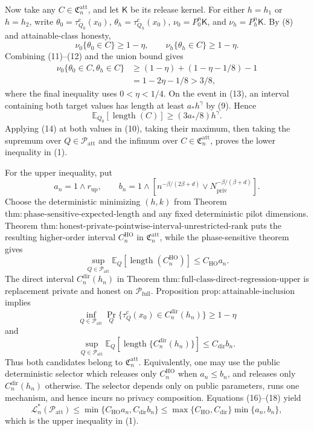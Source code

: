 Now take any \(C\in\mathfrak C_n^{\mathrm{att}}\), and let \(\mathsf K\)
be its release kernel.  For either \(h=h_1\) or \(h=h_2\), write
\(\theta_0=\tau_{Q_0}^{\mathrm c}(x_0)\),
\(\theta_h=\tau_{Q_h}^{\mathrm c}(x_0)\),
\(\nu_0=P_0^n\mathsf K\), and \(\nu_h=P_h^n\mathsf K\).  By (8) and
attainable-class honesty,
\[
 \nu_0\{\theta_0\in C\}\ge1-\eta,
 \qquad
 \nu_h\{\theta_h\in C\}\ge1-\eta.
\tag{12}
\]
Combining (11)--(12) and the union bound gives
\[
 \begin{aligned}
 \nu_0\{\theta_0\in C,\theta_h\in C\}
 &\ge (1-\eta)+(1-\eta-1/8)-1\\
 &=1-2\eta-1/8>3/8,
 \end{aligned}
\tag{13}
\]
where the final inequality uses \(0<\eta<1/4\).  On the event in (13),
an interval containing both target values has length at least
\(a_*h^\gamma\) by (9).  Hence
\[
 \mathbb E_{Q_0}[\operatorname{length}(C)]
 \ge(3a_*/8)h^\gamma.
\tag{14}
\]
Applying (14) at both values in (10), taking their maximum, then taking
the supremum over \(Q\in\mathcal P_{\mathrm{att}}\) and the infimum over
\(C\in\mathfrak C_n^{\mathrm{att}}\), proves the lower inequality in (1).

For the upper inequality, put
\[
 a_n=1\wedge r_{\mathrm{up}},
 \qquad
 b_n=1\wedge\left[n^{-\beta/(2\beta+d)}
          \vee N_{\mathrm{priv}}^{-\beta/(\beta+d)}\right].
\tag{15}
\]
Choose the deterministic minimizing \((h,k)\) from Theorem
\(\mathrm{thm{:}phase\text{-}sensitive\text{-}expected\text{-}length}\)
and any fixed deterministic pilot dimensions.  Theorem
\(\mathrm{thm{:}honest\text{-}private\text{-}pointwise\text{-}interval\text{-}unrestricted\text{-}rank}\)
puts the resulting higher-order interval \(C_n^{\mathrm{HO}}\) in
\(\mathfrak C_n^{\mathrm{att}}\), while the phase-sensitive theorem gives
\[
 \sup_{Q\in\mathcal P_{\mathrm{att}}}
 \mathbb E_Q[\operatorname{length}(C_n^{\mathrm{HO}})]
 \le C_{\mathrm{HO}}a_n.
\tag{16}
\]
The direct interval \(C_n^{\mathrm{dir}}(h_n)\) in Theorem
\(\mathrm{thm{:}full\text{-}class\text{-}direct\text{-}regression\text{-}upper}\)
is replacement private and honest on \(\mathcal P_{\mathrm{full}}\).
Proposition \(\mathrm{prop{:}attainable\text{-}inclusion}\) implies
\[
 \inf_{Q\in\mathcal P_{\mathrm{att}}}
 \Pr_Q\{\tau_Q^{\mathrm c}(x_0)\in C_n^{\mathrm{dir}}(h_n)\}
 \ge1-\eta
\tag{17}
\]
and
\[
 \sup_{Q\in\mathcal P_{\mathrm{att}}}
 \mathbb E_Q[\operatorname{length}\{C_n^{\mathrm{dir}}(h_n)\}]
 \le C_{\mathrm{dir}}b_n.
\tag{18}
\]
Thus both candidates belong to \(\mathfrak C_n^{\mathrm{att}}\).  Equivalently,
one may use the public deterministic selector which releases only
\(C_n^{\mathrm{HO}}\) when \(a_n\le b_n\), and releases only
\(C_n^{\mathrm{dir}}(h_n)\) otherwise.  The selector depends only on public
parameters, runs one mechanism, and hence incurs no privacy composition.
Equations (16)--(18) yield
\[
 \mathcal L_n^*(\mathcal P_{\mathrm{att}})
 \le \min\{C_{\mathrm{HO}}a_n,C_{\mathrm{dir}}b_n\}
 \le \max\{C_{\mathrm{HO}},C_{\mathrm{dir}}\}\min\{a_n,b_n\},
\tag{19}
\]
which is the upper inequality in (1).

